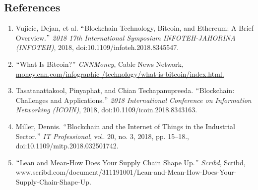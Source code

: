 \documentclass[12pt]{article}
\begin{document}
\newpage

\vspace{\baselineskip}\begin{Center}
\section*{References}
\end{Center}

\begin{enumerate}
	\item  {\fontsize{14pt}{16.8pt}\selectfont Vujicic, Dejan, et al. $``$Blockchain Technology, Bitcoin, and Ethereum: A Brief Overview.$"$  \textit{2018 17th International Symposium INFOTEH-JAHORINA (INFOTEH)}, 2018, doi:10.1109/infoteh.2018.8345547. \par}\par

	\item {\fontsize{14pt}{16.8pt}\selectfont $``$What Is Bitcoin?$"$  \textit{CNNMoney}, Cable News Network, \href{http://money.cnn.com/infographic/technology/what-is-bitcoin/index.html.}{\textcolor[HTML]{1155CC}{money.cnn.com/infographic /technology/what-is-bitcoin/index.html.}}\par}\par

	\item {\fontsize{14pt}{16.8pt}\selectfont Tasatanattakool, Pinyaphat, and Chian Techapanupreeda. $``$Blockchain: Challenges and Applications.$"$  \textit{2018 International Conference on Information Networking (ICOIN)}, 2018, doi:10.1109/icoin.2018.8343163.\par}\par

	\item {\fontsize{14pt}{16.8pt}\selectfont Miller, Dennis. $``$Blockchain and the Internet of Things in the Industrial Sector.$"$  \textit{IT Professional}, vol. 20, no. 3, 2018, pp. 15–18., doi:10.1109/mitp.2018.032501742. \par}\par

	\item {\fontsize{14pt}{16.8pt}\selectfont $``$Lean and Mean-How Does Your Supply Chain Shape Up.$"$  \textit{Scribd}, Scribd, www.scribd.com/document/311191001/Lean-and-Mean-How-Does-Your-Supply-Chain-Shape-Up. \par}\par


\end{enumerate}
\end{document}
